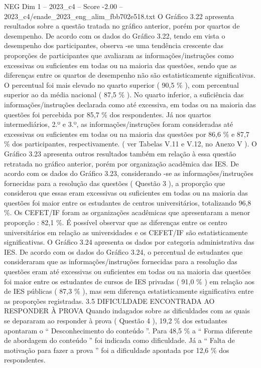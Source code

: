 \begin{textsample}{NEG Dim 1 – 2023\_c4 – Score -2.00 – 2023\_c4/enade\_2023\_eng\_alim\_fbb702e518.txt}
O Gráfico 3.22 apresenta resultados sobre a questão tratada no gráfico anterior, porém por quartos de desempenho.
De acordo com os dados do Gráfico 3.22, tendo em vista o desempenho dos participantes, observa -se uma tendência crescente das proporções de participantes que avaliaram as informações/instruções como excessivas ou suficientes em todas ou na maioria das questões, sendo que as diferenças entre os quartos de desempenho não são estatisticamente significativas.
O percentual foi mais elevado no quarto superior ( 90,5 \% ), com percentual superior ao da média nacional ( 87,5 \% ).
No quarto inferior, a suficiência das informações/instruções declarada como até excessiva, em todas ou na maioria das questões foi percebida por 85,7 \% dos respondentes.
Já nos quartos intermediários, 2.º e 3.º, as informações/instruções foram consideradas até excessivas ou suficientes em todas ou na maioria das questões por 86,6 \% e 87,7 \% dos participantes, respectivamente. ( ver Tabelas V.11 e V.12, no Anexo V ).
O Gráfico 3.23 apresenta outros resultados também em relação à essa questão retratada no gráfico anterior, porém por organização acadêmica das IES.
De acordo com os dados do Gráfico 3.23, considerando -se as informações/instruções fornecidas para a resolução das questões ( Questão 3 ), a proporção que considerou que essas eram excessivas ou suficientes em todas ou na maioria das questões foi maior entre os estudantes de centros universitários, totalizando 96,8 \%.
Os CEFET/IF foram as organizações acadêmicas que apresentaram a menor proporção : 82,1 \%.
É possível observar que as diferenças entre os centro universitários em relação as universidades e os CEFET/IF são estatisticamente significativas.
O Gráfico 3.24 apresenta os dados por categoria administrativa das IES.
De acordo com os dados do Gráfico 3.24, o percentual de estudantes que consideraram que as informações/instruções fornecidas para a resolução das questões eram até excessivas ou suficientes em todas ou na maioria das questões foi maior entre os estudantes de cursos de IES privadas ( 91,0 \% ) em relação aos de IES públicas ( 87,3 \% ), mas sem diferença estatisticamente significativa entre as proporções registradas. 3.5 DIFICULDADE ENCONTRADA AO RESPONDER À PROVA Quando indagados sobre as dificuldades com as quais se depararam ao responder à prova ( Questão 4 ), 19,2 \% dos estudantes apontaram o “ Desconhecimento do conteúdo ”.
Para 48,5 \% a “ Forma diferente de abordagem do conteúdo ” foi indicada como dificuldade.
Já a “ Falta de motivação para fazer a prova ” foi a dificuldade apontada por 12,6 \% dos respondentes.

\end{textsample}
